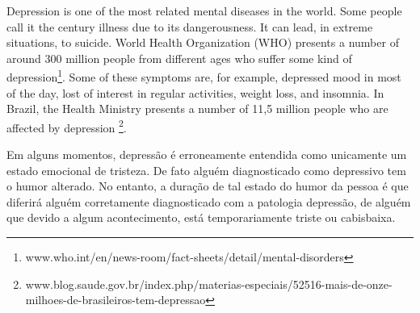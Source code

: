 Depression is one of the most related mental diseases in the world. Some people call it the century illness due to its dangerousness. It can lead, in extreme situations, to suicide\cite{AmericanPsychiatryAssociationApa2013}. World Health Organization (WHO) presents a number of around 300 million people from different ages who suffer some kind of depression\footnote{www.who.int/en/news-room/fact-sheets/detail/mental-disorders}. Some of these symptoms are, for example, depressed mood in most of the day, lost of interest in regular activities, weight loss, and insomnia. In Brazil, the Health Ministry presents a number of 11,5 million people who are affected by depression \footnote{www.blog.saude.gov.br/index.php/materias-especiais/52516-mais-de-onze-milhoes-de-brasileiros-tem-depressao}. 

Em alguns momentos, depressão é erroneamente entendida como unicamente um estado emocional de tristeza. De fato alguém diagnosticado como depressivo tem o humor alterado. No entanto, a duração de tal estado do humor da pessoa é que diferirá alguém corretamente diagnosticado com a patologia depressão, de alguém que devido a algum acontecimento, está temporariamente triste ou cabisbaixa.


